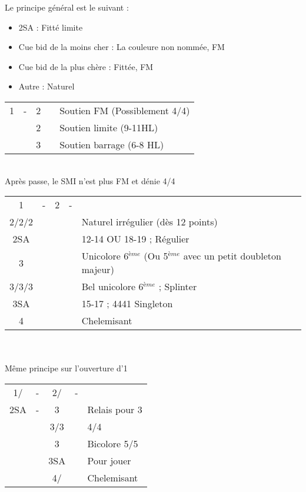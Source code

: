 \documentclass[a4paper, oneside, 11pt]{report}
\begin{document}
		Le principe général est le suivant :
		\begin{itemize}
		\item 2SA : Fitté limite
		\item Cue bid de la moins cher : La couleure non nommée, FM
		\item Cue bid de la plus chère : Fittée, FM
		\item Autre : Naturel\\
		\end{itemize}
		
		\begin{tabular}{cccc|l}
		1\trefle & - & 2\trefle && Soutien FM (Possiblement 4\coeur/4\pique)\\	
		&& 2\carreau && Soutien limite (9-11HL)\\
		&& 3\trefle && Soutien barrage (6-8 HL)\\
		\end{tabular}\\
		Après passe, le SMI n'est plus FM et dénie 4\coeur/4\pique\\
	
		\begin{tabular}{cccc|l}
		1\trefle & - & 2\trefle & - &\\
		2\carreau/2\coeur/2\pique &&&& Naturel irrégulier (dès 12 points)\\
		2SA &&&& 12-14 OU 18-19 ; Régulier\\
		3\trefle &&&& Unicolore 6$^{ème}$ (Ou 5$^{ème}$ avec un petit doubleton majeur)\\
		3\carreau/3\coeur/3\pique &&&& Bel unicolore 6$^{ème}$ ; Splinter\\
		3SA &&&& 15-17 ; 4441 Singleton \carreau\\
		4\trefle &&&& Chelemisant \trefle\\
		\end{tabular}\\\\

		Même principe sur l'ouverture d'1\carreau\\

		\begin{tabular}{cccc|l}
		1\trefle/\carreau & - & 2\trefle/\carreau & - &\\
		2SA & - & 3\trefle && Relais pour 3\carreau\\
		&& 3\carreau/3\coeur && 4\coeur/4\pique\\
		&& 3\pique && Bicolore 5\trefle/5\carreau\\
		&& 3SA && Pour jouer\\
		&& 4\trefle/\carreau && Chelemisant\\
		\end{tabular}\\\\
\end{document}
